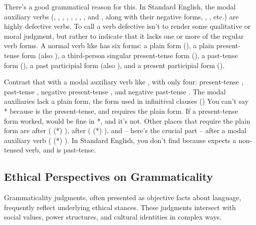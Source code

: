 There's a good grammatical reason for this. In Standard English, the modal auxiliary verbs (, , , , , , , , and , along with their negative forms, , , etc.) are highly defective verbs. To call a verb defective isn't to render some qualitative or moral judgment, but rather to indicate that it lacks one or more of the regular verb forms. A normal verb like  has six forms: a plain form (), a plain present-tense form (also ), a third-person singular present-tense form (), a past-tense form (), a past participial form (also ), and a present participial form ().

Contrast that with a modal auxiliary verb like , with only four: present-tense , past-tense , negative present-tense , and negative past-tense . The modal auxiliaries lack a plain form, the form used in infinitival clauses () You can't say * because  is the present-tense, and  requires the plain form. If a present-tense form worked,  would be fine in *, and it's not. Other places that require the plain form are after  ( (*) ), after  ( (*) ), and -- here's the crucial part -- after a modal auxiliary verb ( (*) ). In Standard English, you don't find  because  expects a non-tensed verb, and  is past-tense.

\subsection{Ethical Perspectives on Grammaticality}

Grammaticality judgments, often presented as objective facts about language, frequently reflect underlying ethical stances. These judgments intersect with social values, power structures, and cultural identities in complex ways.

